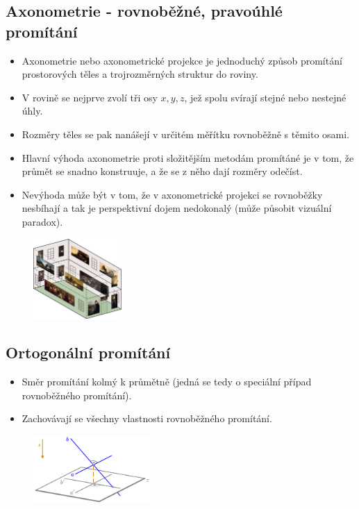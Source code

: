 \subsection{Axonometrie - rovnoběžné, pravoúhlé promítání}
\begin{itemize}
	\item Axonometrie nebo axonometrické projekce je jednoduchý způsob promítání prostorových těles a trojrozměrných struktur do roviny.
	\item V rovině se nejprve zvolí tři osy $x, y, z$, jež spolu svírají stejné nebo nestejné úhly.
	\item Rozměry těles se pak nanášejí v určitém měřítku rovnoběžně s těmito osami.
	\item Hlavní výhoda axonometrie proti složitějším metodám promítáné je v tom, že průmět se snadno konstruuje, a že se z něho dají rozměry odečíst.
	\item Nevýhoda může být v tom, že v axonometrické projekci se rovnoběžky nesbíhají a tak je perspektivní dojem nedokonalý (může působit vizuální paradox).
\end{itemize}

\begin{figure}[H]
\centering
\includegraphics[width=0.3\textwidth]{assets/2_axonometrie}
\end{figure}

\subsection{Ortogonální promítání}
\begin{itemize}
	\item Směr promítání kolmý k průmětně (jedná se tedy o speciální případ rovnoběžného promítání).
	\item Zachovávají se všechny vlastnosti rovnoběžného promítání.
\end{itemize}
\begin{figure}[H]
\centering
\includegraphics[width=0.4\textwidth]{assets/2_ortogonalni.png}
\end{figure}
